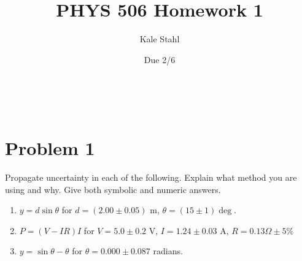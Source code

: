\documentclass[]{article}
\title{PHYS 506 Homework 1}
\date{Due 2/6}
\author{Kale Stahl}
\newcommand{\bd}{\textbf}
\begin{document}
	
	\makeatletter
	\begin{center}
		{\centering \Large \bd \@title}\\
		\vspace{.5cm}
		{\large \@author}
		\vspace{.25cm}
	\end{center}
	\makeatother
	
	\section*{Problem 1}
		Propagate uncertainty in each of the following. Explain what method you are using and why. Give both symbolic and numeric answers.
		\begin{enumerate}[label = \bd{(\alph*)}]
			\item $y = d\sin \theta$ for $d = (2.00\pm 0.05)$ m, $\theta = (15 \pm 1)\deg$.
			\item $P = (V-IR)I$ for $V = 5.0 \pm 0.2$ V, $I = 1.24 \pm 0.03$ A, $R = 0.13 \Omega \pm 5\%$
			\item $y = \sin \theta - \theta$ for $\theta = 0.000 \pm 0.087$ radians.
		\end{enumerate}
\end{document}
